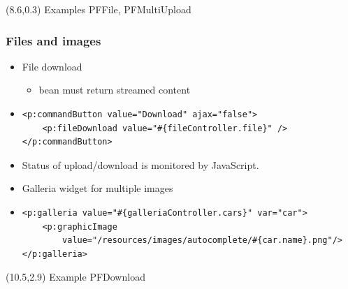 \documentclass[10pt,xcolor=pdflatex]{beamer}
\begin{document}
\begin{frame}[containsverbatim]
\begin{itemize}
\begin{itemize}
      \end{itemize}
  \end{itemize}
\begin{textblock}{10}(8.6,0.3)
    {\footnotesize Examples PFFile, PFMultiUpload}
\end{textblock}
\end{frame}


\begin{frame}[containsverbatim]\frametitle{Files and images}
  \begin{itemize}
    \item File download
      \begin{itemize}
        \item bean must return streamed content
      \end{itemize}
    \item[] \begin{footnotesize} \begin{verbatim}
<p:commandButton value="Download" ajax="false">
    <p:fileDownload value="#{fileController.file}" />
</p:commandButton>		
		\end{verbatim} \end{footnotesize}
    \item Status of upload/download is monitored by JavaScript.
	\item Galleria widget for multiple images
    \item[] \begin{footnotesize} \begin{verbatim}
<p:galleria value="#{galleriaController.cars}" var="car">
    <p:graphicImage 
        value="/resources/images/autocomplete/#{car.name}.png"/>
</p:galleria>    
    \end{verbatim} \end{footnotesize}
  \end{itemize}
\begin{textblock}{10}(10.5,2.9)
    {\footnotesize Example PFDownload}
\end{textblock}
\end{frame}
\end{document}
